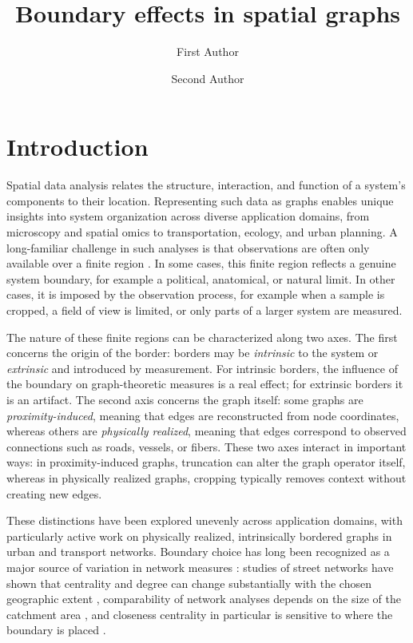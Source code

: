 \documentclass[fleqn,10pt]{olplainarticle}
\title{Boundary effects in spatial graphs}
\author[1]{First Author}
\author[2]{Second Author}
\affil[1]{Address of first author}
\affil[2]{Address of second author}
\begin{document}
\flushbottom
\maketitle
\thispagestyle{empty}
\FloatBarrier
\section*{Introduction}
Spatial data analysis relates the structure, interaction, and function of a system's components to their location. Representing such data as graphs enables unique insights into system organization across diverse application domains, from microscopy and spatial omics to transportation, ecology, and urban planning. A long-familiar challenge in such analyses is that observations are often only available over a finite region \citep{griffith1983evaluation}. In some cases, this finite region reflects a genuine system boundary, for example a political, anatomical, or natural limit. In other cases, it is imposed by the observation process, for example when a sample is cropped, a field of view is limited, or only parts of a larger system are measured.

The nature of these finite regions can be characterized along two axes. The first concerns the origin of the border: borders may be \emph{intrinsic} to the system or \emph{extrinsic} and introduced by measurement. For intrinsic borders, the influence of the boundary on graph-theoretic measures is a real effect; for extrinsic borders it is an artifact. The second axis concerns the graph itself: some graphs are \emph{proximity-induced}, meaning that edges are reconstructed from node coordinates, whereas others are \emph{physically realized}, meaning that edges correspond to observed connections such as roads, vessels, or fibers. These two axes interact in important ways: in proximity-induced graphs, truncation can alter the graph operator itself, whereas in physically realized graphs, cropping typically removes context without creating new edges.

These distinctions have been explored unevenly across application domains, with particularly active work on physically realized, intrinsically bordered graphs in urban and transport networks. Boundary choice has long been recognized as a major source of variation in network measures \citep{rheinwalt2012boundary, park2009boundary}: studies of street networks have shown that centrality and degree can change substantially with the chosen geographic extent \citep{gil2015examining, gil2017street, sadler2011application}, comparability of network analyses depends on the size of the catchment area \citep{chen2021comparability}, and closeness centrality in particular is sensitive to where the boundary is placed \citep{chen2023normalized}.
\end{document}
